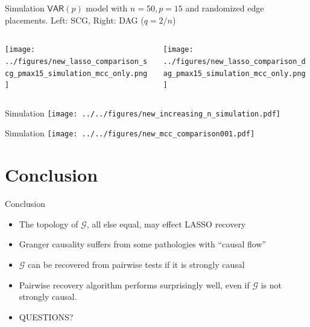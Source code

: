 \documentclass{beamer} %
\def\gcg{\mathcal{G}}  %
\def\VAR{\mathsf{VAR}}  %
\begin{document}
\begin{frame}{Simulation}
  $\VAR(p)$ model with $n = 50, p = 15$ and randomized edge placements.  Left: SCG, Right: DAG ($q = 2/n$)
  \begin{columns}
    \begin{column}{0.5\linewidth}
      \texttt{[image: ../figures/new\_lasso\_comparison\_scg\_pmax15\_simulation\_mcc\_only.png]}
    \end{column}

    \begin{column}{0.5\linewidth}
      \texttt{[image: ../figures/new\_lasso\_comparison\_dag\_pmax15\_simulation\_mcc\_only.png]}
    \end{column}
  \end{columns}
\end{frame}

\begin{frame}{Simulation}
  \texttt{[image: ../../figures/new\_increasing\_n\_simulation.pdf]}\pause
\end{frame}

\begin{frame}{Simulation}
  \texttt{[image: ../../figures/new\_mcc\_comparison001.pdf]}
\end{frame}

\section{Conclusion}
\begin{frame}{Conclusion}
  \begin{itemize}
    \item{The topology of $\gcg$, all else equal, may effect LASSO recovery}\pause
    \item{Granger causality suffers from some pathologies with ``causal flow''}\pause
    \item{$\gcg$ can be recovered from pairwise tests if it is strongly causal}\pause
    \item{Pairwise recovery algorithm performs surprisingly well, even if $\gcg$ is not strongly causal.}\pause
    \item{QUESTIONS?}
  \end{itemize}
\end{frame}
\end{document}
